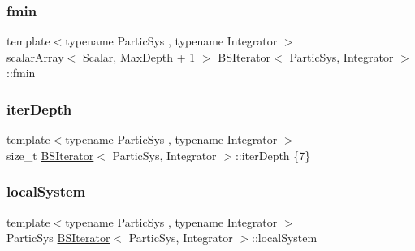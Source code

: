 \mbox{\label{class_b_s_iterator_a05bf5c727d23e47349683cda1a08ed13}} 
\subsubsection{\texorpdfstring{fmin}{fmin}}
{\footnotesize\ttfamily template$<$typename Partic\+Sys , typename Integrator $>$ \\
\mbox{\hyperlink{class_b_s_iterator_ab0aa7c10b56500273af05dcd85fd8389}{scalar\+Array}}$<$ \mbox{\hyperlink{class_b_s_iterator_a7857f8ff9032955ea4dcc22cd18ca7a1}{Scalar}}, \mbox{\hyperlink{class_b_s_iterator_a39409b9a12d4854d101ce59a0efc0f74}{Max\+Depth}} + 1 $>$ \mbox{\hyperlink{class_b_s_iterator}{B\+S\+Iterator}}$<$ Partic\+Sys, Integrator $>$\+::fmin\hspace{0.3cm}{\ttfamily [private]}}

\mbox{\label{class_b_s_iterator_aa073f847cc5855f727c8f326f539a5f0}} 
\subsubsection{\texorpdfstring{iter\+Depth}{iterDepth}}
{\footnotesize\ttfamily template$<$typename Partic\+Sys , typename Integrator $>$ \\
size\+\_\+t \mbox{\hyperlink{class_b_s_iterator}{B\+S\+Iterator}}$<$ Partic\+Sys, Integrator $>$\+::iter\+Depth \{7\}\hspace{0.3cm}{\ttfamily [private]}}

\mbox{\label{class_b_s_iterator_a9d6fc5f237246465161ea86854985395}} 
\subsubsection{\texorpdfstring{local\+System}{localSystem}}
{\footnotesize\ttfamily template$<$typename Partic\+Sys , typename Integrator $>$ \\
Partic\+Sys \mbox{\hyperlink{class_b_s_iterator}{B\+S\+Iterator}}$<$ Partic\+Sys, Integrator $>$\+::local\+System\hspace{0.3cm}{\ttfamily [private]}}


